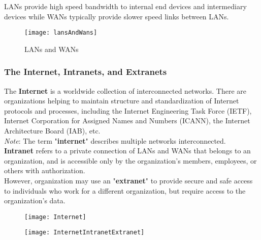 \documentclass[crop=false]{standalone}
\begin{document}
LANs provide high speed bandwidth to internal end devices and intermediary devices while WANs typically provide slower speed links between LANs.

\begin{figure}[ht]
  \centering
  \texttt{[image: lansAndWans]}
  \caption{LANs and WANs}
  \label{fig:LANs and WANs}
\end{figure}

\subsubsection{The Internet, Intranets, and Extranets}
The \textbf{Internet} is a worldwide collection of interconnected networks. There are organizations helping to maintain structure and standardization of Internet protocols and processes, including the Internet Engineering Task Force (IETF), Internet Corporation for Assigned Names and Numbers (ICANN), the Internet Architecture Board (IAB), etc.\\
\textit{Note}: The term "\textbf{internet}" describes multiple networks interconnected.\\
\textbf{Intranet} refers to a private connection of LANs and WANs that belongs to an organization, and is accessible only by the organization's members, employees, or others with authorization.\\
However, organization may use an "\textbf{extranet}" to provide secure and safe access to individuals who work for a different organization, but require access to the organization’s data.

\begin{figure}[ht]
\centering
\begin{minipage}{.5\textwidth}
  \centering
  \texttt{[image: Internet]}
  \label{fig:Internet: collection of interconnected networks}
\end{minipage}%
\begin{minipage}{.5\textwidth}
  \centering
  \texttt{[image: InternetIntranetExtranet]}
  \label{fig:Internet Intranet and Extranet}
\end{minipage}
\end{figure}
\end{document}
